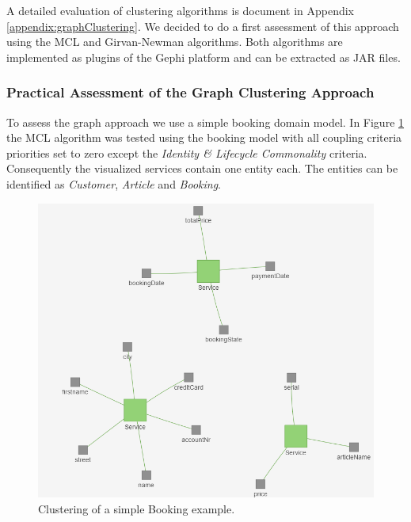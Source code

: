 A detailed evaluation of clustering algorithms is document in Appendix \ref{appendix:graphClustering}. We decided to do a first assessment of this approach using the \gls{MCL}\cite{markovCluster} and Girvan-Newman\cite{girvan} algorithms. Both algorithms are implemented as plugins of the Gephi\cite{gephi} platform and can be extracted as \gls{JAR} files.

\subsubsection{Practical Assessment of the Graph Clustering Approach}

To assess the graph approach we use a simple booking domain model. In Figure \ref{fig:clusteringBookingSimple} the MCL algorithm was tested using the booking model with all coupling criteria priorities set to zero except the \textit{Identity \& Lifecycle Commonality} criteria. Consequently the visualized services contain one entity each. The entities can be identified as \textit{Customer}, \textit{Article} and \textit{Booking}.

\begin{figure}[H]
	\begin{center}
		\includegraphics[scale=0.8]{images/booking_entities.png}
	\end{center}
	\caption{Clustering of a simple Booking example.}
	\label{fig:clusteringBookingSimple}
\end{figure}


